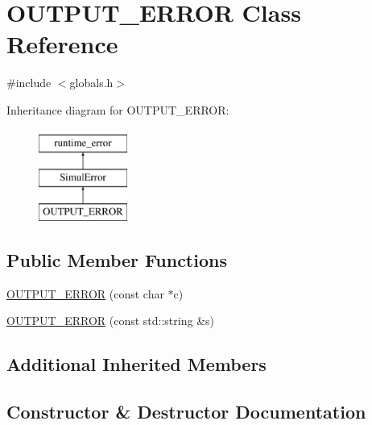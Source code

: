 \hypertarget{classOUTPUT__ERROR}{}\section{O\+U\+T\+P\+U\+T\+\_\+\+E\+R\+R\+OR Class Reference}
\label{classOUTPUT__ERROR}


{\ttfamily \#include $<$globals.\+h$>$}

Inheritance diagram for O\+U\+T\+P\+U\+T\+\_\+\+E\+R\+R\+OR\+:\begin{figure}[H]
\begin{center}
\leavevmode
\includegraphics[height=3.000000cm]{classOUTPUT__ERROR}
\end{center}
\end{figure}
\subsection*{Public Member Functions}
\begin{DoxyCompactItemize}
\item 
\hyperlink{classOUTPUT__ERROR_ab3c3ae05be45d2b0ee3f362b61584bef}{O\+U\+T\+P\+U\+T\+\_\+\+E\+R\+R\+OR} (const char $\ast$c)
\item 
\hyperlink{classOUTPUT__ERROR_abdf8edc6e3ea161cc5fac3bf6baffae1}{O\+U\+T\+P\+U\+T\+\_\+\+E\+R\+R\+OR} (const std\+::string \&s)
\end{DoxyCompactItemize}
\subsection*{Additional Inherited Members}


\subsection{Constructor \& Destructor Documentation}
\mbox{\label{classOUTPUT__ERROR_ab3c3ae05be45d2b0ee3f362b61584bef}} 
